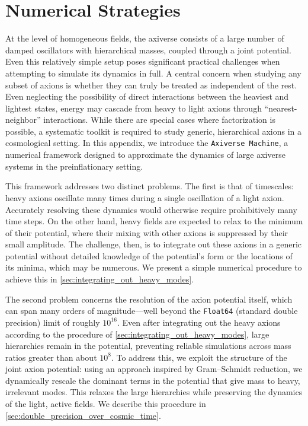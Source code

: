 \documentclass[11pt]{article}
\begin{document}
\appendix
\section{Numerical Strategies}

At the level of homogeneous fields, the axiverse consists of a large number of damped oscillators with hierarchical masses, coupled through a joint potential. Even this relatively simple setup poses significant practical challenges when attempting to simulate its dynamics in full. A central concern when studying any subset of axions is whether they can truly be treated as independent of the rest. Even neglecting the possibility of direct interactions between the heaviest and lightest states, energy may cascade from heavy to light axions through ``nearest-neighbor'' interactions. While there are special cases where factorization is possible, a systematic toolkit is required to study generic, hierarchical axions in a cosmological setting. In this appendix, we introduce the \texttt{Axiverse Machine}, a numerical framework designed to approximate the dynamics of large axiverse systems in the preinflationary setting. 

This framework addresses two distinct problems. The first is that of timescales: heavy axions oscillate many times during a single oscillation of a light axion. Accurately resolving these dynamics would otherwise require prohibitively many time steps. On the other hand, heavy fields are expected to relax to the minimum of their potential, where their mixing with other axions is suppressed by their small amplitude. The challenge, then, is to integrate out these axions in a generic potential without detailed knowledge of the potential’s form or the locations of its minima, which may be numerous. We present a simple numerical procedure to achieve this in \cref{sec:integrating_out_heavy_modes}.

The second problem concerns the resolution of the axion potential itself, which can span many orders of magnitude—well beyond the \texttt{Float64} (standard double precision) limit of roughly $10^{16}$. Even after integrating out the heavy axions according to the procedure of \cref{sec:integrating_out_heavy_modes}, large hierarchies remain in the potential, preventing reliable simulations across mass ratios greater than about $10^8$. To address this, we exploit the structure of the joint axion potential: using an approach inspired by Gram--Schmidt reduction, we dynamically rescale the dominant terms in the potential that give mass to heavy, irrelevant modes. This relaxes the large hierarchies while preserving the dynamics of the light, active fields. We describe this procedure in \cref{sec:double_precision_over_cosmic_time}.
\end{document}
